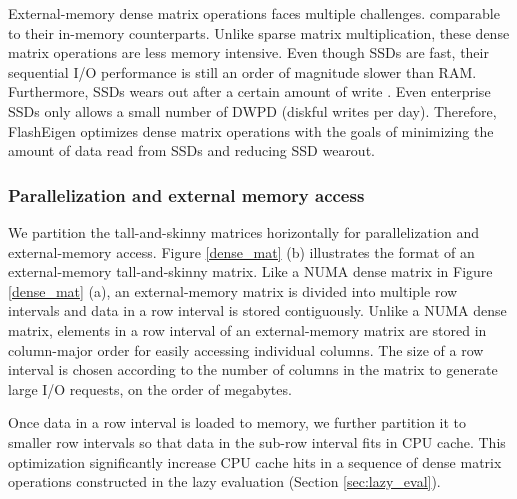 External-memory dense matrix operations faces multiple challenges.
comparable to their in-memory counterparts. Unlike sparse matrix
multiplication, these dense matrix operations are less memory intensive.
Even though SSDs are fast, their sequential I/O performance is still an order
of magnitude slower than RAM.
Furthermore, SSDs wears out after a certain amount of write \cite{}.
Even enterprise SSDs \cite{} only allows a small number of DWPD
(diskful writes per day). Therefore, FlashEigen optimizes dense matrix operations
with the goals of minimizing the amount of data read from SSDs and reducing SSD
wearout.

%		

\subsubsection{Parallelization and external memory access} \label{par_em}
We partition the tall-and-skinny matrices horizontally for parallelization
and external-memory access. Figure \ref{dense_mat} (b) illustrates the format
of an external-memory tall-and-skinny matrix. Like a NUMA dense matrix in
Figure \ref{dense_mat} (a),
an external-memory matrix is divided into multiple row intervals and data
in a row interval is stored contiguously. Unlike a NUMA dense matrix, elements
in a row interval of an external-memory matrix are stored in column-major order
for easily accessing individual columns. The size of a row interval is chosen
according to the number of columns in the matrix to generate large I/O requests,
on the order of megabytes.

Once data in a row interval is loaded to memory, we further partition it to
smaller row intervals so that data
in the sub-row interval fits in CPU cache.  This optimization significantly
increase CPU cache hits in a sequence of dense matrix operations constructed in
the lazy evaluation (Section \ref{sec:lazy_eval}).

